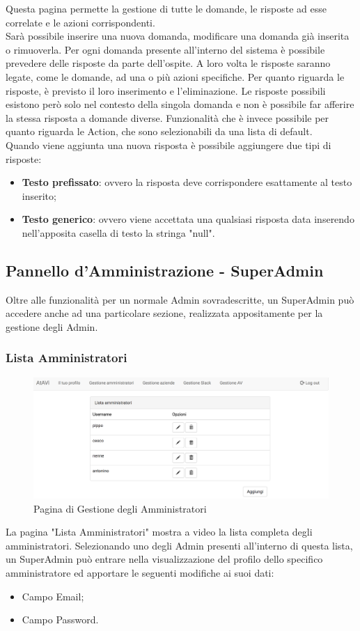 \documentclass[../ManualeUtente_v2.0.0.tex]{subfiles}
\begin{document}
	Questa pagina permette la gestione di tutte le domande, le risposte ad esse correlate e le azioni corrispondenti.\\
	Sarà possibile inserire una nuova domanda, modificare una domanda già inserita o rimuoverla. Per ogni domanda presente all'interno del sistema è possibile prevedere delle risposte da parte dell'ospite. A loro volta le risposte saranno legate, come le domande, ad una o più azioni specifiche. Per quanto riguarda le risposte, è previsto il loro inserimento e l'eliminazione. Le risposte possibili esistono però solo nel contesto della singola domanda e non è possibile far afferire la stessa risposta a domande diverse. Funzionalità che è invece possibile per quanto riguarda le Action, che sono selezionabili da una lista di default.\\
	Quando viene aggiunta una nuova risposta è possibile aggiungere due tipi di risposte:
	\begin{itemize}
		\item \textbf{Testo prefissato}: ovvero la risposta deve corrispondere esattamente al testo inserito;
		\item \textbf{Testo generico}: ovvero viene accettata una qualsiasi risposta data inserendo nell'apposita casella di testo la stringa "null".
	\end{itemize}
	
	\newpage
	\subsection{Pannello d'Amministrazione - SuperAdmin}
	Oltre alle funzionalità per un normale Admin sovradescritte, un SuperAdmin può accedere anche ad una particolare sezione, realizzata appositamente per la gestione degli Admin.
	\subsubsection{Lista Amministratori}
	\begin{figure}[!h]
		\centering
		\includegraphics[scale=0.25]{Screenshot/admin-manageAdmins.png}
		\caption{Pagina di Gestione degli Amministratori}
	\end{figure}
	La pagina "Lista Amministratori" mostra a video la lista completa degli amministratori. Selezionando uno degli Admin presenti all'interno di questa lista, un SuperAdmin può entrare nella visualizzazione del profilo dello specifico amministratore ed apportare le seguenti modifiche ai suoi dati:
	\begin{itemize}
		\item{Campo Email};
		\item{Campo Password}.
	\end{itemize}
\end{document}
